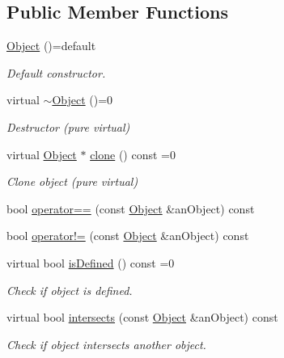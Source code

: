 \subsection*{Public Member Functions}
\begin{DoxyCompactItemize}
\item 
\hyperlink{classlibrary_1_1math_1_1geom_1_1d2_1_1_object_a35b722f64aded8d8e660074a23af237a}{Object} ()=default
\begin{DoxyCompactList}\small\item\em Default constructor. \end{DoxyCompactList}\item 
virtual \hyperlink{classlibrary_1_1math_1_1geom_1_1d2_1_1_object_a092ca69d924f7226fceeb35f5532887c}{$\sim$\+Object} ()=0
\begin{DoxyCompactList}\small\item\em Destructor (pure virtual) \end{DoxyCompactList}\item 
virtual \hyperlink{classlibrary_1_1math_1_1geom_1_1d2_1_1_object}{Object} $\ast$ \hyperlink{classlibrary_1_1math_1_1geom_1_1d2_1_1_object_a5c26ae4120edb24f6463d65a9cef247d}{clone} () const =0
\begin{DoxyCompactList}\small\item\em Clone object (pure virtual) \end{DoxyCompactList}\item 
bool \hyperlink{classlibrary_1_1math_1_1geom_1_1d2_1_1_object_a97aeb08c0dbe7f803188ae335f6b0e7a}{operator==} (const \hyperlink{classlibrary_1_1math_1_1geom_1_1d2_1_1_object}{Object} \&an\+Object) const
\item 
bool \hyperlink{classlibrary_1_1math_1_1geom_1_1d2_1_1_object_a538fa27124314cddf9705cf35a3efc08}{operator!=} (const \hyperlink{classlibrary_1_1math_1_1geom_1_1d2_1_1_object}{Object} \&an\+Object) const
\item 
virtual bool \hyperlink{classlibrary_1_1math_1_1geom_1_1d2_1_1_object_ae9506254971168a3ca63e1923556b70d}{is\+Defined} () const =0
\begin{DoxyCompactList}\small\item\em Check if object is defined. \end{DoxyCompactList}\item 
virtual bool \hyperlink{classlibrary_1_1math_1_1geom_1_1d2_1_1_object_a22819b510e52283c19c4ed947e0cba97}{intersects} (const \hyperlink{classlibrary_1_1math_1_1geom_1_1d2_1_1_object}{Object} \&an\+Object) const
\begin{DoxyCompactList}\small\item\em Check if object intersects another object. \end{DoxyCompactList}\item 

\end{DoxyCompactItemize}
